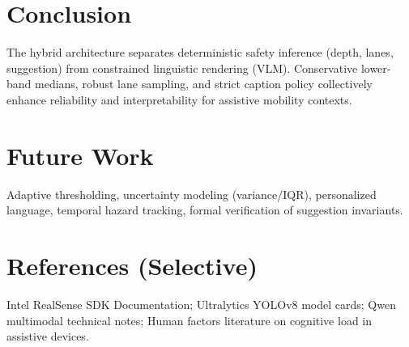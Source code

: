 \documentclass[11pt,a4paper]{article}
\begin{document}
\section{Conclusion}
The hybrid architecture separates deterministic safety inference (depth, lanes, suggestion) from constrained linguistic rendering (VLM). Conservative lower-band medians, robust lane sampling, and strict caption policy collectively enhance reliability and interpretability for assistive mobility contexts.

\section{Future Work}
Adaptive thresholding, uncertainty modeling (variance/IQR), personalized language, temporal hazard tracking, formal verification of suggestion invariants.

\section{References (Selective)}
Intel RealSense SDK Documentation; Ultralytics YOLOv8 model cards; Qwen multimodal technical notes; Human factors literature on cognitive load in assistive devices.
\end{document}
